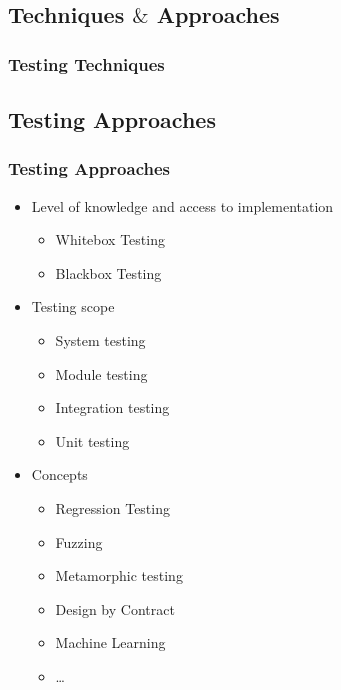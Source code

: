 
\subsection{Techniques $\&$ Approaches}


\begin{frame}
\frametitle{Testing Techniques}
  \begin{center}
  \end{center}
\end{frame}


\subsection{Testing Approaches}


\begin{frame}[fragile]
\frametitle{Testing Approaches}

\begin{itemize}
\item<1-> Level of \alert<1>{knowledge} and \alert<1>{access} to implementation
\begin{itemize}
\item Whitebox Testing
\item Blackbox Testing
\end{itemize}
\end{itemize}

\begin{minipage}[t]{0.49\textwidth}
\begin{itemize}
\item<2-> \alert<2>{Testing scope}
\begin{itemize}
\item System testing
\item Module testing
\item Integration testing
\item Unit testing
\end{itemize}
\end{itemize}
\end{minipage}
%
\begin{minipage}[t]{0.49\textwidth}
\begin{itemize}
\item<3-> \alert<3>{Concepts}
\begin{itemize}
\item Regression Testing
\item Fuzzing
\item Metamorphic testing
\item Design by Contract
\item Machine Learning
\item \ldots
\end{itemize}
\end{itemize}
\end{minipage}

\end{frame}

